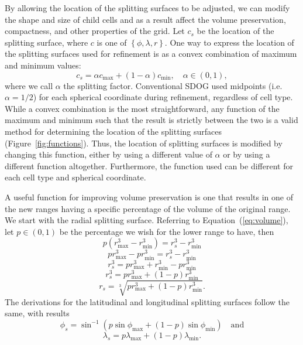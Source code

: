By allowing the location of the splitting surfaces to be adjusted, we can modify the shape and size of child cells and as a result affect the volume preservation, compactness, and other properties of the grid.
Let $c_{s}$ be the location of the splitting surface, where $c$ is one of $\left\lbrace \phi, \lambda, r \right\rbrace$.
One way to express the location of the splitting surfaces used for refinement is as a convex combination of maximum and minimum values:
%
\begin{equation*}
c_{s} = \alpha c_\mathrm{max} + \left( 1-\alpha \right) c_\mathrm{min}, \quad \alpha \in \left( 0, 1 \right),
\end{equation*}
%
where we call $\alpha$ the splitting factor.
Conventional SDOG used midpoints (i.e. $\alpha = 1/2$) for each spherical coordinate during refinement, regardless of cell type.
While a convex combination is the most straightforward, any function of the maximum and minimum such that the result is strictly between the two is a valid method for determining the location of the splitting surfaces (Figure~\ref{fig:functions}).
Thus, the location of splitting surfaces is modified by changing this function, either by using a different value of $\alpha$ or by using a different function altogether.
Furthermore, the function used can be different for each cell type and spherical coordinate.


A useful function for improving volume preservation is one that results in one of the new ranges having a specific percentage of the volume of the original range.
We start with the radial splitting surface.
Referring to Equation~(\ref{eq:volume}), let $p \in (0,1)$ be the percentage we wish for the lower range to have, then
%
\begin{equation*}
p \left( r_\mathrm{max}^{3} - r_\mathrm{min}^{3} \right) = r_{s}^{3} - r_\mathrm{min}^{3}
\end{equation*}
%
\begin{equation*}
p r_\mathrm{max}^{3} - p r_\mathrm{min}^{3} = r_{s}^{3} - r_\mathrm{min}^{3}
\end{equation*}
%
\begin{equation*}
r_{s}^{3} = p r_\mathrm{max}^{3} + r_\mathrm{min}^{3} - p r_\mathrm{min}^{3}
\end{equation*}
%
\begin{equation*}
r_{s}^{3} = p r_\mathrm{max}^{3} + \left( 1 - p \right) r_\mathrm{min}^{3}
\end{equation*}
%
\begin{equation} \label{eq:radVol}
r_{s} = \sqrt[3]{ p r_\mathrm{max}^{3} + \left( 1 - p \right) r_\mathrm{min}^{3} }.
\end{equation}
%
The derivations for the latitudinal and longitudinal splitting surfaces follow the same, with results
%
\begin{equation} \label{eq:latVol}
\phi_{s} = \sin^{-1} \left( p \sin\phi_\mathrm{max} + \left( 1 - p \right) \sin\phi_\mathrm{min} \right) \quad\text{and}
\end{equation}
%
\begin{equation} \label{eq:longVol}
\lambda_{s} = p \lambda_\mathrm{max} + \left( 1 - p \right) \lambda_\mathrm{min}.
\end{equation}


